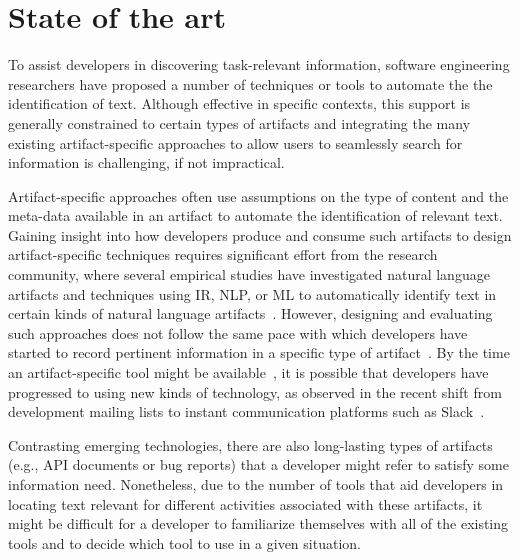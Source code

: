 \section{State of the art}
\label{cp1:novelty}






To assist developers in discovering task-relevant information,
software engineering researchers have proposed 
a number of techniques or tools 
to automate the the identification of  text.
Although effective in specific contexts, this support is generally constrained 
to certain
types of artifacts and integrating the many existing artifact-specific
approaches to allow users to seamlessly search
for information is challenging, if not impractical. 


Artifact-specific approaches often use assumptions on the type of content 
and the meta-data available in an artifact
to automate the identification of relevant text.
Gaining insight into how developers produce and consume 
such artifacts to design artifact-specific techniques
 requires significant effort from the research community,
 where several empirical studies have investigated 
natural language artifacts 
and techniques using \acf{IR}, \acf{NLP}, or \acf{ML}  to automatically identify
text in certain kinds of natural language artifacts~\cite{panichella2012, Ko2006, Arya2019, Maalej2013}.
However, designing and evaluating such approaches
does not follow the same pace with which developers have started to 
record pertinent information in a specific type of artifact~\cite{garousi2019}.
By the time an artifact-specific tool might be available~\cite{gibbs1994},
it is possible 
that developers have progressed to using new kinds of technology,
as observed in the recent shift from 
development mailing lists to instant communication platforms such as Slack~\cite{Lin2016, Chatterjee2020}. 




Contrasting emerging technologies, 
there are also
long-lasting types of artifacts (e.g., API documents or bug reports) that a developer
might refer to satisfy some information need. 
Nonetheless, due to the number of tools 
that aid developers in locating text relevant 
for different activities associated with these artifacts, it might be difficult for a developer to familiarize themselves 
with all of the existing tools
and to decide which tool to use in a given situation.




